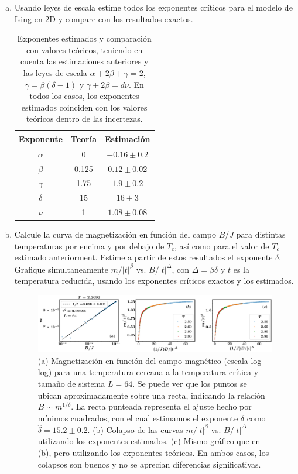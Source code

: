 \documentclass[10pt]{article}
\begin{document}
\begin{enumerate}[a)]
\pagebreak

\item Usando leyes de escala estime todos los exponentes críticos para el modelo de Ising en 2D y compare con los resultados exactos.

\begin{table}[ht]
\centering
\begin{tabular}{c|c|c}
 Exponente & Teoría & Estimación  \\ \hline
 $\alpha$  & 0 & $-0.16\pm 0.2$  \\
 $\beta$  & 0.125 &  $0.12\pm 0.02$ \\
 $\gamma$ & 1.75 &  $1.9\pm 0.2$ \\
 $\delta$  & 15 &  $ 16\pm 3$ \\
 $\nu$ & 1 & $1.08\pm 0.08$
\end{tabular}
\caption{Exponentes estimados y comparación con valores teóricos, teniendo en cuenta las estimaciones anteriores y las leyes de escala $\alpha + 2\beta + \gamma = 2$, $\gamma = \beta (\delta - 1)$ y $\gamma + 2\beta = d\nu$. En todos los casos, los exponentes estimados coinciden con los valores teóricos dentro de las incertezas.}
\end{table}


\pagebreak

\item Calcule la curva de magnetización en función del campo $B/J$ para distintas temperaturas por encima y por debajo de $T_c$, así como para el valor de $T_c$ estimado anteriorment. Estime a partir de estos resultados el exponente $\delta$. Grafique simultaneamente $m/|t|^{\beta}$ vs. $B/|t|^{\Delta}$, con $\Delta = \beta \delta$ y $t$ es la temperatura reducida, usando los exponentes críticos exactos y los estimados. 

\begin{figure}[ht]
\centering
\includegraphics[scale=0.27]{Fig5.pdf}
\caption{(a) Magnetización en función del campo magnético (escala log-log) para una temperatura cercana a la temperatura crítica y tamaño de sistema $L = 64$. Se puede ver que los puntos se ubican aproximadamente sobre una recta, indicando la relación $B\sim m^{1/\delta}$. La recta punteada representa el ajuste hecho por mínimos cuadrados, con el cual estimamos el exponente $\delta$ como $\hat{\delta} = 15.2\pm 0.2$. (b) Colapso de las curvas $m/|t|^{\beta}$ vs. $B/|t|^{\Delta}$ utilizando los exponentes estimados. (c) Mismo gráfico que en (b), pero utilizando los exponentes teóricos. En ambos casos, los colapsos son buenos y no se aprecian diferencias significativas. }
\end{figure}



\end{enumerate}
\end{document}
